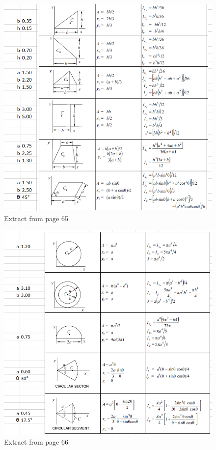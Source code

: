 \begin{figure}
	\centering
	\includegraphics[width=1.0\linewidth]{img/Ass2Img1}
	\caption{Extract from page 65}
	\label{fig:ass2img1}
\end{figure}

\begin{figure}
	\centering
	\includegraphics[width=1.0\linewidth]{img/Ass2Img2}
	\caption{Extract from page 66}
	\label{fig:ass2img2}
\end{figure}

